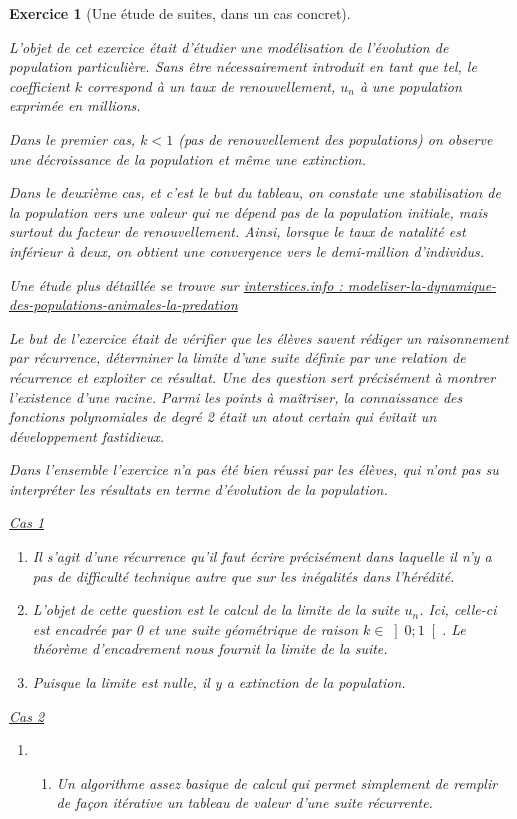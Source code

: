 \documentclass[12pt,a4paper]{article}
\theoremstyle{break}
\theoremstyle{nobreak}
\newtheorem{exercice}{Exercice}
\theoremstyle{nonumberplain}
\begin{document}
\begin{exercice}[Une étude de suites, dans un cas concret]~

  L'objet de cet exercice était d'étudier une modélisation de
  l'évolution de population particulière. Sans être nécessairement
  introduit en tant que tel, le coefficient $k$ correspond à un taux de
  renouvellement, $u_n$ à une population exprimée en millions.

  Dans le premier cas, $k<1$ (pas de renouvellement des populations) on
  observe une décroissance de la population et même une extinction.

  Dans le deuxième cas, et c'est le but du tableau, on constate une
  stabilisation de la population vers une valeur qui ne dépend pas de la
  population initiale, mais surtout du facteur de renouvellement. Ainsi,
  lorsque le taux de natalité est inférieur à deux, on obtient une
  convergence vers le demi-million d'individus.

  Une étude plus détaillée se trouve sur
  \href{https://interstices.info/jcms/i_56750/modeliser-la-dynamique-des-populations-animales-la-predation}{interstices.info
  : modeliser-la-dynamique-des-popu\-lations-animales-la-predation}

  Le but de l'exercice était de vérifier que les élèves savent rédiger
  un raisonnement par récurrence, déterminer la limite d'une suite
  définie par une relation de récurrence et exploiter ce résultat. Une
  des question sert précisément à montrer l'existence d'une racine.
  Parmi les points à maîtriser, la connaissance des fonctions
  polynomiales de degré 2 était un atout certain qui évitait un
  développement fastidieux.

  Dans l'ensemble l'exercice n'a pas été bien réussi par les élèves, qui
n'ont pas su interpréter les résultats en terme d'évolution de la
  population.

  \underline{Cas \no{} 1}
  \begin{enumerate}
    \item Il s'agit d'une récurrence qu'il faut écrire précisément dans
      laquelle il n'y a pas de difficulté technique autre que sur les
      inégalités dans l'hérédité.
    \item L'objet de cette question est le calcul de la limite de la
      suite $u_n$. Ici, celle-ci est encadrée par 0 et une suite
      géométrique de raison $k\in\left]0;1\right[$. Le théorème
      d'encadrement nous fournit la limite de la suite.
    \item Puisque la limite est nulle, il y a extinction de la
      population.
  \end{enumerate}
  \underline{Cas \no{} 2}
  \begin{enumerate}
    \item \begin{enumerate}
           \item Un algorithme assez basique de calcul qui permet
             simplement de remplir  de façon itérative un tableau de
             valeur d'une suite récurrente.


\end{enumerate}
\end{enumerate}
\end{exercice}
\end{document}
